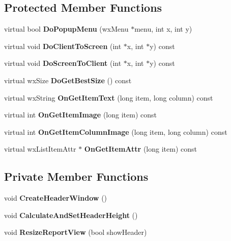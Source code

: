 \subsection*{Protected Member Functions}
\begin{DoxyCompactItemize}
\item 
virtual bool {\bfseries DoPopupMenu} (wxMenu $\ast$menu, int x, int y)\label{classMuleExtern_1_1wxGenericListCtrl_acc34d97dd48659357616a3bad7c43f2b}

\item 
virtual void {\bfseries DoClientToScreen} (int $\ast$x, int $\ast$y) const \label{classMuleExtern_1_1wxGenericListCtrl_a55f961ecc8f3e3e5db4e9fdafb28a719}

\item 
virtual void {\bfseries DoScreenToClient} (int $\ast$x, int $\ast$y) const \label{classMuleExtern_1_1wxGenericListCtrl_ae89ef714c2a0833bc80f9c1703886a66}

\item 
virtual wxSize {\bfseries DoGetBestSize} () const \label{classMuleExtern_1_1wxGenericListCtrl_ac5c53d913b5c076d2e96916850f8f604}

\item 
virtual wxString {\bfseries OnGetItemText} (long item, long column) const \label{classMuleExtern_1_1wxGenericListCtrl_a5dc78c2bce3a35a2958b7140fffba6dc}

\item 
virtual int {\bfseries OnGetItemImage} (long item) const \label{classMuleExtern_1_1wxGenericListCtrl_afafdc0fe04369d9eb2b508548ba48cb2}

\item 
virtual int {\bfseries OnGetItemColumnImage} (long item, long column) const \label{classMuleExtern_1_1wxGenericListCtrl_a352644ec607728bfb09635316bc122cd}

\item 
virtual wxListItemAttr $\ast$ {\bfseries OnGetItemAttr} (long item) const \label{classMuleExtern_1_1wxGenericListCtrl_a19e0eac1c6a678595323fd93e05db146}

\end{DoxyCompactItemize}
\subsection*{Private Member Functions}
\begin{DoxyCompactItemize}
\item 
void {\bfseries CreateHeaderWindow} ()\label{classMuleExtern_1_1wxGenericListCtrl_a3dfeec6ceab8374253e094d74f618ee2}

\item 
void {\bfseries CalculateAndSetHeaderHeight} ()\label{classMuleExtern_1_1wxGenericListCtrl_a7614dfac1458ef15f18601dde7c323ba}

\item 
void {\bfseries ResizeReportView} (bool showHeader)\label{classMuleExtern_1_1wxGenericListCtrl_ad0dccc75efebe394e5bb99d9cf1e63ac}

\end{DoxyCompactItemize}
